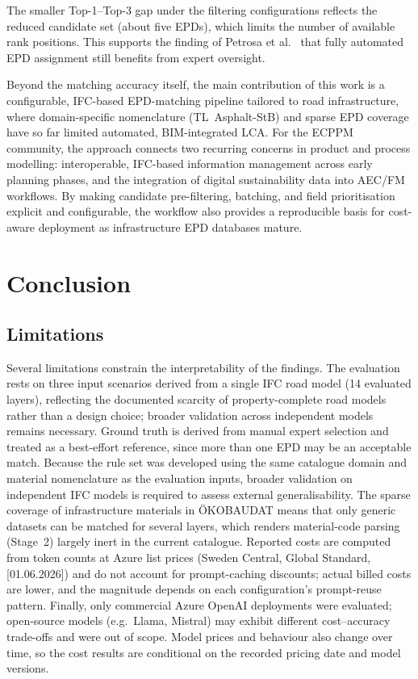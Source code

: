 \documentclass[10pt, a4paper, twocolumn]{article}
\begin{document}
The smaller Top-1--Top-3 gap under the filtering
configurations reflects the reduced candidate set (about five EPDs), which limits
the number of available rank positions. This supports the finding of Petrosa et
al.~\cite{Petrosa.2025} that fully automated EPD assignment still benefits from
expert oversight.

Beyond the matching accuracy itself, the main contribution of this work is a
configurable, IFC-based EPD-matching pipeline tailored to road infrastructure,
where domain-specific nomenclature (TL~Asphalt-StB) and sparse EPD coverage have so
far limited automated, BIM-integrated LCA. For the ECPPM community, the approach
connects two recurring concerns in product and process modelling: interoperable,
IFC-based information management across early planning phases, and the integration
of digital sustainability data into AEC/FM workflows. By making candidate
pre-filtering, batching, and field prioritisation explicit and configurable, the
workflow also provides a reproducible basis for cost-aware deployment as
infrastructure EPD databases mature.

\section{Conclusion}

\subsection{Limitations}
    \label{sec:limitations}

Several limitations constrain the interpretability of the findings. The evaluation
rests on three input scenarios derived from a single IFC road model (14 evaluated
layers), reflecting the documented scarcity of property-complete road models rather
than a design choice; broader validation across independent models remains
necessary. Ground truth is derived from manual expert selection and treated as a
best-effort reference, since more than one EPD may be an acceptable match. 
Because the rule set was developed using the same catalogue domain and material nomenclature as the evaluation inputs, broader validation on independent IFC models is required to assess external generalisability.
The
sparse coverage of infrastructure materials in \"OKOBAUDAT means that only generic
datasets can be matched for several layers, which renders material-code parsing
(Stage~2) largely inert in the current catalogue. Reported costs are computed from
token counts at Azure list prices (Sweden Central, Global Standard, [01.06.2026])
and do not account for prompt-caching discounts; actual billed costs are lower, and
the magnitude depends on each configuration's prompt-reuse pattern. Finally, only
commercial Azure OpenAI deployments were evaluated; open-source models (e.g.\ Llama,
Mistral) may exhibit different cost--accuracy trade-offs and were out of scope.
Model prices and behaviour also change over time, so the cost results are
conditional on the recorded pricing date and model versions.
\end{document}
